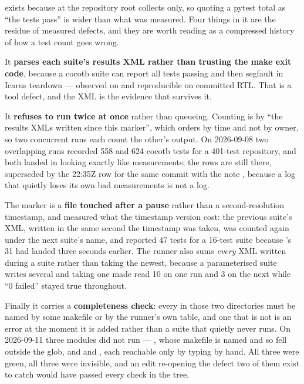  exists because  at the
repository root collects  only, so quoting a pytest total
as ``the tests pass'' is wider than what was measured. Four things in it
are the residue of measured defects, and they are worth reading as a
compressed history of how a test count goes wrong.

It \textbf{parses each suite's results XML rather than trusting the make
exit code}, because a cocotb suite can report all tests passing and then
segfault in Icarus teardown --- observed on 
and reproducible on committed RTL. That is a tool defect, and the XML is
the evidence that survives it.

It \textbf{refuses to run twice at once} rather than queueing. Counting
is by ``the results XMLs written since this marker'', which orders by
time and not by owner, so two concurrent runs each count the other's
output. On 2026-09-08 two overlapping runs recorded 558 and 624 cocotb
tests for a 401-test repository, and both landed in
 looking exactly like measurements; the rows
are still there, superseded by the 22:35Z row for the same commit
 with the note
,
because a log that quietly loses its own bad measurements is not a log.

The marker is a \textbf{file touched after a pause} rather than a
second-resolution timestamp, and  measured what the timestamp
version cost: the previous suite's XML, written in the same second the
timestamp was taken, was counted again under the next suite's name, and
 reported 47 tests for a 16-test suite because
's 31 had landed three seconds earlier. The runner also
sums \emph{every} XML written during a suite rather than taking the
newest, because a parameterised suite writes several and taking one made
 read 10 on one run and 3 on the next while ``0
failed'' stayed true throughout.

Finally it carries a \textbf{completeness check}: every
 in those two directories must be named by some
makefile or by the runner's own table, and one that is not is an error
at the moment it is added rather than a suite that quietly never runs.
On 2026-09-11 three modules did not run --- ,
whose makefile is named  and so fell outside the
 glob, and  and
, each reachable only by typing
 by hand. All three were green, all three were invisible,
and an edit re-opening the defect two of them exist to catch would have
passed every check in the tree.

